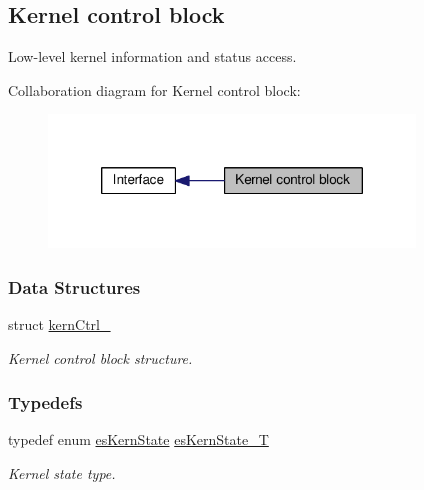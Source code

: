 \hypertarget{group__kern__ctrl}{\subsection{Kernel control block}
\label{group__kern__ctrl}
}


Low-\/level kernel information and status access.  


Collaboration diagram for Kernel control block\-:\nopagebreak
\begin{figure}[H]
\begin{center}
\leavevmode
\includegraphics[width=276pt]{group__kern__ctrl}
\end{center}
\end{figure}
\subsubsection*{Data Structures}
\begin{DoxyCompactItemize}
\item 
struct \hyperlink{structkernCtrl__}{kern\-Ctrl\-\_\-}
\begin{DoxyCompactList}\small\item\em Kernel control block structure. \end{DoxyCompactList}\end{DoxyCompactItemize}
\subsubsection*{Typedefs}
\begin{DoxyCompactItemize}
\item 
typedef enum \hyperlink{group__kern__ctrl_gac9be6bfeddbd6af148cdb3867fbc24af}{es\-Kern\-State} \hyperlink{group__kern__ctrl_gab5edef44fe53303f96dc5e9f567babaf}{es\-Kern\-State\-\_\-\-T}
\begin{DoxyCompactList}\small\item\em Kernel state type. \end{DoxyCompactList}\end{DoxyCompactItemize}
